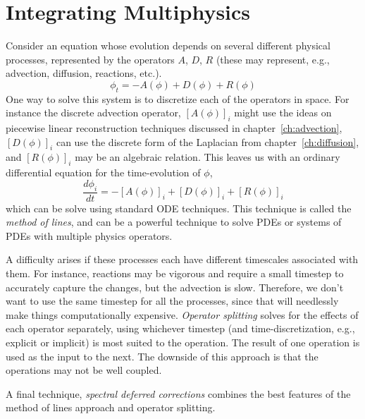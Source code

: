 
\begin{quote}
\end{quote}

\section{Integrating Multiphysics}

Consider an equation whose evolution depends on several different
physical processes, represented by the operators $A$, $D$,
$R$ (these may represent, e.g., advection, diffusion, reactions,
etc.).  
\begin{equation}
\phi_t = -A(\phi) + D(\phi) + R(\phi)
\end{equation}
One way to solve this system is to discretize each of the operators in
space.  For instance the discrete advection operator, $[A(\phi)]_i$
might use the ideas on piecewise linear reconstruction techniques
discussed in chapter~\ref{ch:advection}, $[D(\phi)]_i$ can use the
discrete form of the Laplacian from chapter~\ref{ch:diffusion}, and
$[R(\phi)]_i$ may be an algebraic relation.  This leaves us with an ordinary differential equation for the time-evolution of $\phi$,
\begin{equation}
\frac{d\phi_i}{dt} = -[A(\phi)]_i + [D(\phi)]_i + [R(\phi)]_i
\end{equation}
which can be solve using standard ODE techniques.  This technique
is called the {\em method of lines}, and can be a powerful technique
to solve PDEs or systems of PDEs with multiple physics operators.

A difficulty arises if these processes each have different timescales
associated with them.  For instance, reactions may be vigorous and
require a small timestep to accurately capture the changes, but
the advection is slow.  Therefore, we don't want to use the same 
timestep for all the processes, since that will needlessly make things
computationally expensive.  {\em Operator splitting} solves for the
effects of each operator separately, using whichever timestep (and
time-discretization, e.g., explicit or implicit) is most suited to the
operation.  The result of one operation is used as the input to the
next.  The downside of this approach is that the operations may
not be well coupled.

A final technique, {\em spectral deferred corrections} combines the 
best features of the method of lines approach and operator splitting.


